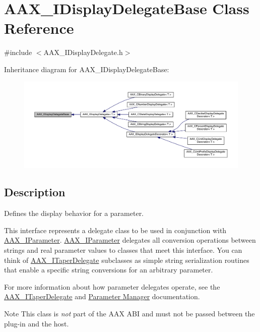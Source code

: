 \hypertarget{a00093}{}\section{A\+A\+X\+\_\+\+I\+Display\+Delegate\+Base Class Reference}
\label{a00093}


{\ttfamily \#include $<$A\+A\+X\+\_\+\+I\+Display\+Delegate.\+h$>$}



Inheritance diagram for A\+A\+X\+\_\+\+I\+Display\+Delegate\+Base\+:
\nopagebreak
\begin{figure}[H]
\begin{center}
\leavevmode
\includegraphics[width=350pt]{a00616}
\end{center}
\end{figure}


\subsection{Description}
Defines the display behavior for a parameter. 

This interface represents a delegate class to be used in conjunction with \hyperlink{a00108}{A\+A\+X\+\_\+\+I\+Parameter}. \hyperlink{a00108}{A\+A\+X\+\_\+\+I\+Parameter} delegates all conversion operations between strings and real parameter values to classes that meet this interface. You can think of \hyperlink{a00114}{A\+A\+X\+\_\+\+I\+Taper\+Delegate} subclasses as simple string serialization routines that enable a specific string conversions for an arbitrary parameter.

For more information about how parameter delegates operate, see the \hyperlink{a00114}{A\+A\+X\+\_\+\+I\+Taper\+Delegate} and \hyperlink{a00344}{Parameter Manager} documentation.

\begin{DoxyNote}{Note}
This class is {\itshape not} part of the A\+A\+X A\+B\+I and must not be passed between the plug-\/in and the host. 
\end{DoxyNote}
